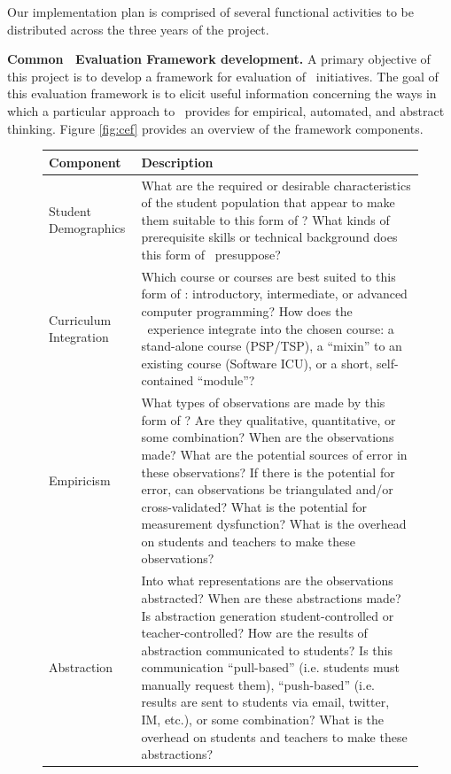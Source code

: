 Our implementation plan is comprised of several functional activities to be
distributed across the three years of the project.

{\bf Common \eCT\ Evaluation Framework development.}  A primary objective
of this project is to develop a framework for evaluation of \eCT\
initiatives.  The goal of this evaluation framework is to elicit useful
information concerning the ways in which a particular approach to \eCT\
provides for empirical, automated, and abstract thinking. Figure
\ref{fig:cef} provides an overview of the framework components.

\begin{figure}[!ht]
\begin{tabular}{|p{1in}|p{5in}|} \hline
{\bf Component} & {\bf Description}  \\ \hline

Student \newline Demographics & What are the required or desirable characteristics of the
student population that appear to make them suitable to this form of
\eCT? What kinds of prerequisite skills or technical background does this
form of \eCT\ presuppose?  
\\ \hline

Curriculum \newline Integration & 
Which course or courses are best suited to this form of
\eCT: introductory, intermediate, or advanced computer
programming? How does the \eCT\ experience integrate into the
chosen course: a stand-alone course (PSP/TSP), a ``mixin'' to an
existing course (Software ICU), or a short, self-contained ``module''?
\\ \hline

Empiricism & What types of observations are made by this form of \eCT? Are
they qualitative, quantitative, or some combination?  When are the
observations made?  What are the potential sources of error in these
observations? If there is the potential for error, can observations be
triangulated and/or cross-validated? What is the potential for measurement
dysfunction? What is the overhead on students and teachers to make these
observations?  
\\ \hline

Abstraction & Into what representations are the observations abstracted?
When are these abstractions made?  Is abstraction generation
student-controlled or teacher-controlled?  How are the results of
abstraction communicated to students?  Is this communication ``pull-based''
(i.e. students must manually request them), ``push-based'' (i.e. results
are sent to students via email, twitter, IM, etc.), or some combination?
What is the overhead on students and teachers to make these abstractions? 
\\ \hline


\end{tabular}
\end{figure}
